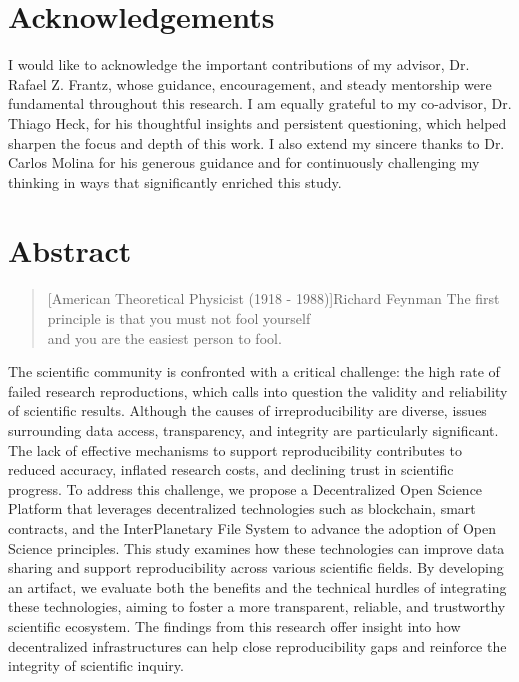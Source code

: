 \documentclass[final]{rc-book-2.14}
\begin{document}
\chapter{Acknowledgements}
\label{chp:acknowledge}

\drop
I would like to acknowledge the important contributions of my advisor, Dr. Rafael Z. Frantz, whose guidance, encouragement, and steady mentorship were fundamental throughout this research. I am equally grateful to my co-advisor, Dr. Thiago Heck, for his thoughtful insights and persistent questioning, which helped sharpen the focus and depth of this work. I also extend my sincere thanks to Dr. Carlos Molina for his generous guidance and for continuously challenging my thinking in ways that significantly enriched this study.

\chapter{Abstract}
\label{chp:general-abstract:english}


\begin{quotation}[American Theoretical Physicist (1918 - 1988)]{Richard Feynman}
    The first principle is that you must not fool yourself \\ and you are the easiest person to fool.
\end{quotation}

\drop  The scientific community is confronted with a critical challenge: the high rate of failed research reproductions, which calls into question the validity and reliability of scientific results. Although the causes of irreproducibility are diverse, issues surrounding data access, transparency, and integrity are particularly significant. The lack of effective mechanisms to support reproducibility contributes to reduced accuracy, inflated research costs, and declining trust in scientific progress. To address this challenge, we propose a Decentralized Open Science Platform that leverages decentralized technologies such as blockchain, smart contracts, and the InterPlanetary File System to advance the adoption of Open Science principles. This study examines how these technologies can improve data sharing and support reproducibility across various scientific fields. By developing an artifact, we evaluate both the benefits and the technical hurdles of integrating these technologies, aiming to foster a more transparent, reliable, and trustworthy scientific ecosystem. The findings from this research offer insight into how decentralized infrastructures can help close reproducibility gaps and reinforce the integrity of scientific inquiry.
\end{document}
